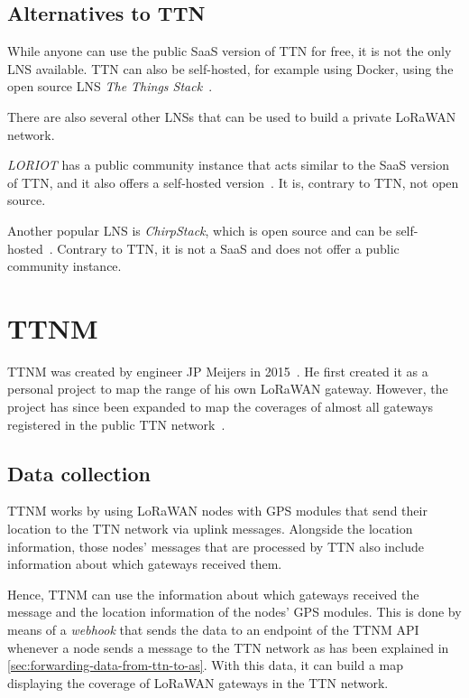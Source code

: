 \subsection{Alternatives to \acf{TTN}}

While anyone can use the public \ac{SaaS} version of \ac{TTN} for free, it is not the only \ac{LNS} available.
\ac{TTN} can also be self-hosted, for example using Docker, using the open source \ac{LNS} \emph{The Things Stack}~\cite{the_things_network_host_2023}.

There are also several other \acp{LNS} that can be used to build a private \ac{LoRaWAN} network.

\emph{LORIOT} has a public community instance that acts similar to the \ac{SaaS} version of \ac{TTN}, and it also offers a self-hosted version~\cite{loriot_ag_loriot_2023}.
It is, contrary to \ac{TTN}, not open source.

Another popular \ac{LNS} is \emph{ChirpStack}, which is open source and can be self-hosted~\cite{chirpstack_chirpstack_2023}.
Contrary to \ac{TTN}, it is not a \ac{SaaS} and does not offer a public community instance.

\section{\acf{TTNM}}

\acf{TTNM} was created by engineer JP Meijers in 2015~\cite{linkedin_23_nodate}.
He first created it as a personal project to map the range of his own \ac{LoRaWAN} gateway.
However, the project has since been expanded to map the coverages of almost all gateways registered in the public \ac{TTN} network~\cite{the_things_network_jp_2018}.

\subsection{Data collection}\label{sec:ttm-data-collection}

\acl{TTNM} works by using \ac{LoRaWAN} nodes with \ac{GPS} modules that send their location to the \ac{TTN} network via uplink messages.
Alongside the location information, those nodes' messages that are processed by \ac{TTN} also include information about which gateways received them.

Hence, \acl{TTNM} can use the information about which gateways received the message and the location information of the nodes' \ac{GPS} modules.
This is done by means of a \emph{webhook} that sends the data to an endpoint of the \acl{TTNM} \ac{API} whenever a node sends a message to the \ac{TTN} network as has been explained in \cref{sec:forwarding-data-from-ttn-to-as}.
With this data, it can build a map displaying the coverage of \ac{LoRaWAN} gateways in the \ac{TTN} network.

